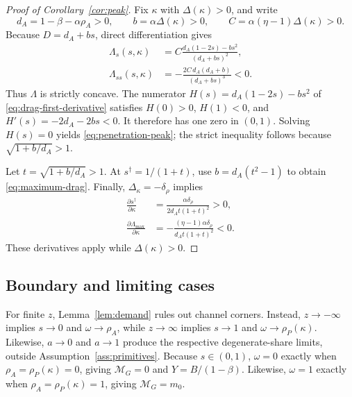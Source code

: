 \begin{proof}[Proof of Corollary~\ref{cor:peak}]
Fix \(\kappa\) with \(\Delta(\kappa)>0\), and write
\[
 d_A=1-\beta-\alpha\rho_A>0,\qquad
 b=\alpha\Delta(\kappa)>0,\qquad
 C=\alpha(\eta-1)\Delta(\kappa)>0.
\]
Because \(D=d_A+bs\), direct differentiation gives
\begin{align}
 \Lambda_s(s,\kappa)
 &=C\frac{d_A(1-2s)-bs^2}{(d_A+bs)^2},
 \label{eq:drag-first-derivative}\\
 \Lambda_{ss}(s,\kappa)
 &=-\frac{2C\,d_A(d_A+b)}{(d_A+bs)^3}<0.
 \label{eq:drag-second-derivative}
\end{align}
Thus \(\Lambda\) is strictly concave. The numerator
\(H(s)=d_A(1-2s)-bs^2\) of \eqref{eq:drag-first-derivative} satisfies
\(H(0)>0\), \(H(1)<0\), and \(H'(s)=-2d_A-2bs<0\). It therefore has one
zero in \((0,1)\). Solving \(H(s)=0\) yields
\eqref{eq:penetration-peak}; the strict inequality follows because
\(\sqrt{1+b/d_A}>1\).

Let \(t=\sqrt{1+b/d_A}>1\). At \(s^\dagger=1/(1+t)\), use
\(b=d_A(t^2-1)\) to obtain \eqref{eq:maximum-drag}. Finally,
\(\Delta_\kappa=-\delta_\rho\) implies
\begin{align}
 \frac{\partial s^\dagger}{\partial\kappa}
 &=\frac{\alpha\delta_\rho}{2d_A t(1+t)^2}>0,
 \label{eq:peak-location-capacity}\\
 \frac{\partial\Lambda_{\max}}{\partial\kappa}
 &=-\frac{(\eta-1)\alpha\delta_\rho}{d_A t(1+t)^2}<0.
 \label{eq:peak-height-capacity}
\end{align}
These derivatives apply while \(\Delta(\kappa)>0\).
\end{proof}

\subsection{Boundary and limiting cases}

For finite \(z\), Lemma~\ref{lem:demand} rules out channel corners. Instead,
\(z\to-\infty\) implies \(s\to0\) and \(\omega\to\rho_A\), while
\(z\to\infty\) implies \(s\to1\) and
\(\omega\to\rho_P(\kappa)\).
Likewise, \(a\to0\) and \(a\to1\) produce the respective degenerate-share
limits, outside Assumption~\ref{ass:primitives}.
Because \(s\in(0,1)\), \(\omega=0\) exactly when
\(\rho_A=\rho_P(\kappa)=0\), giving \(\mathcal M_G=0\) and
\(Y=B/(1-\beta)\). Likewise, \(\omega=1\) exactly when
\(\rho_A=\rho_P(\kappa)=1\), giving \(\mathcal M_G=m_0\).

